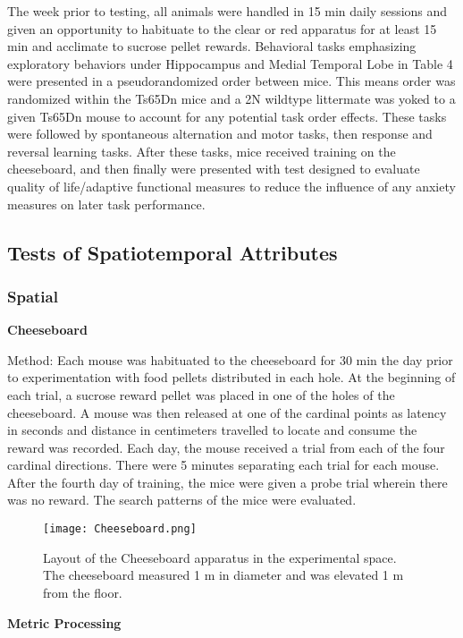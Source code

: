 \documentclass{article}
\begin{document}
The week prior to testing, all animals were handled in 15 min daily sessions and given an opportunity to habituate to the clear or red apparatus for at least 15 min and acclimate to sucrose pellet rewards. Behavioral tasks emphasizing exploratory behaviors under Hippocampus and Medial Temporal Lobe in Table 4 were presented in a pseudorandomized order between mice. This means order was randomized within the Ts65Dn mice and a 2N wildtype littermate was yoked to a given Ts65Dn mouse to account for any potential task order effects. These tasks were followed by spontaneous alternation and motor tasks, then response and reversal learning tasks. After these tasks, mice received training on the cheeseboard, and then finally were presented with test designed to evaluate quality of life/adaptive functional measures to reduce the influence of any anxiety measures on later task performance.

\subsection{Tests of Spatiotemporal Attributes}
\subsubsection{Spatial}

\textbf{Cheeseboard}

Method: Each mouse was habituated to the cheeseboard for 30 min the day prior to experimentation with food pellets distributed in each hole. At the beginning of each trial, a sucrose reward pellet was placed in one of the holes of the cheeseboard. A mouse was then released at one of the cardinal points as latency in seconds and distance in centimeters travelled to locate and consume the reward was recorded. Each day, the mouse received a trial from each of the four cardinal directions. There were 5 minutes separating each trial for each mouse. After the fourth day of training, the mice were given a probe trial wherein there was no reward. The search patterns of the mice were evaluated.

\begin{figure}[h!]
\centering
\texttt{[image: Cheeseboard.png]}
\caption{Layout of the Cheeseboard apparatus in the experimental space. The cheeseboard measured 1 m in diameter and was elevated 1 m from the floor.}
\label{fig:Cheeseboard}
\end{figure}

\textbf{Metric Processing}
\end{document}
